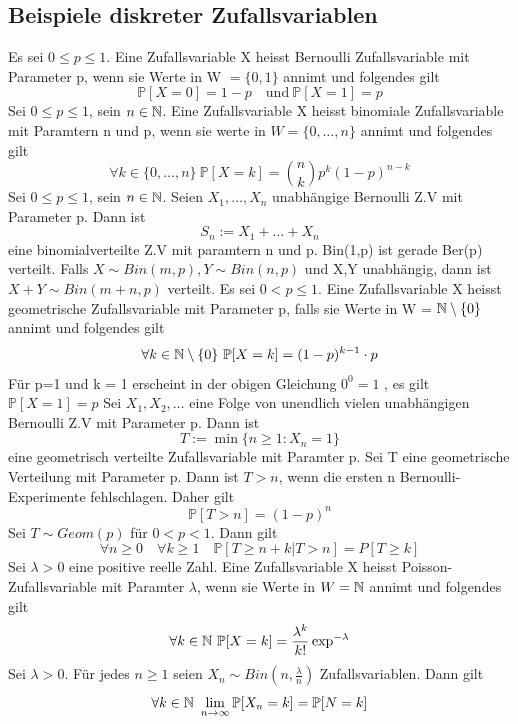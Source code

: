 \subsection{Beispiele diskreter Zufallsvariablen}
 \newline
Es sei \( 0 \leq p \leq 1\). Eine Zufallsvariable X heisst Bernoulli Zufallsvariable mit Parameter p, wenn sie Werte in W \( = \{0,1\}\) annimt und folgendes gilt \[ \mathbb{P}[X=0] = 1-p \quad \text{und} \ \mathbb{P}[X=1] = p\]
\Def[3.11 Binomialverteilung] \newline
Sei \( 0 \leq p \leq 1\), sein \( n \in \mathbb{N}\). Eine Zufallsvariable X heisst binomiale Zufallsvariable mit Paramtern n und p, wenn sie werte in \( W = \{ 0, \dots , n\}\) annimt und folgendes gilt \[\forall k \in \{0, \dots , n\} \ \mathbb{P}[X=k] = \binom{n}{k} p^k(1-p)^{n-k}\]
 \newline
Sei \( 0 \leq p \leq 1\), sein \( n \in \mathbb{N}\). Seien \( X_1, \dots, X_n\) unabhängige Bernoulli Z.V mit Parameter p. Dann ist \[ S_n := X_1 + \dots + X_n\] eine binomialverteilte Z.V mit paramtern n und p.
\Bem[3.14] \newline
Bin(1,p) ist gerade Ber(p) verteilt. Falls \(X \sim Bin(m,p), Y \sim Bin(n,p) \) und X,Y unabhängig, dann ist \(X + Y \sim Bin(m+n, p)\)  verteilt.
 \newline
Es sei \( 0 < p \leq 1\). Eine Zufallsvariable X heisst geometrische Zufallsvariable mit Parameter p, falls sie Werte in W = \( \mathbb{N} \setminus \{0\}\) annimt und folgendes gilt \[\forall k \in \N \setminus \{0\} \ \mathbb{P}[X=k] = (1-p)^{k-1} \cdot p\]
\Bem[3.16] \newline
Für p=1 und k = 1 erscheint in der obigen Gleichung \(0^0 = 1\) , es gilt \( \mathbb{P}[X=1] = p\) \newline
\Satz[3.18] \newline
Sei \(X_1, X_2, \dots \) eine Folge von unendlich vielen unabhängigen Bernoulli Z.V mit Parameter p. Dann ist \[ T:= \min\{n \geq 1 : X_n = 1\}\] eine geometrisch verteilte Zufallsvariable mit Paramter p. \newline
\Bem[3.18A] \newline
Sei T eine geometrische Verteilung mit Parameter p. Dann ist \( T > n\), wenn die ersten n Bernoulli-Experimente fehlschlagen. Daher gilt \[ \mathbb{P}[T > n] = (1-p)^n\]
 \newline
Sei \( T \sim Geom(p)\) für \( 0 < p < 1\). Dann gilt \[ \forall n \geq 0 \quad \forall k \geq 1 \quad \mathbb{P}[T \geq n + k | T > n] = P[T \geq k]\]
\Def[3.21] \newline
Sei \( \lambda > 0\) eine positive reelle Zahl. Eine Zufallsvariable X heisst Poisson-Zufallsvariable mit Paramter \( \lambda\), wenn sie Werte in \( W = \mathbb{N} \) annimt und folgendes gilt \[ \forall k \in \N \ \mathbb{P}[X = k] = \frac{\lambda^k}{k!}\exp^{-\lambda}\]
 \newline
Sei \( \lambda > 0\). Für jedes \( n \geq 1 \) seien \( X_n \sim Bin(n, \frac{\lambda}{n})\)  Zufallsvariablen. Dann gilt \[ \forall k \in \mathbb{N} \ \lim_{n \rightarrow \infty } \mathbb{P}[X_n = k] = \mathbb{P}[N =k]\]
